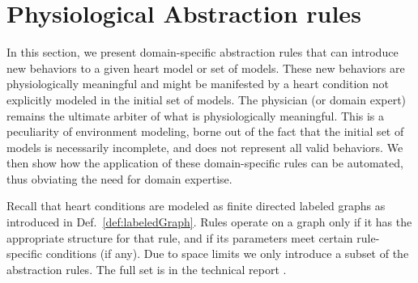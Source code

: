 \section{Physiological Abstraction rules}
\label{abstractionRules} 
In this section, we present domain-specific abstraction rules that can introduce new behaviors to a given heart model or set of models. 
These new behaviors are physiologically meaningful and might be manifested by a heart condition not explicitly modeled in the initial set of models.
The physician (or domain expert) remains the ultimate arbiter of what is physiologically meaningful.
This is a peculiarity of environment modeling, borne out of the fact that the initial set of models is necessarily incomplete, and does not represent all valid behaviors.
We then show how the application of these domain-specific rules can be automated, thus obviating the need for domain expertise.

Recall that heart conditions are modeled as finite directed labeled graphs as introduced in Def.~\ref{def:labeledGraph}.
Rules operate on a graph only if it has the appropriate structure for that rule, and if its parameters meet certain rule-specific conditions (if any).
Due to space limits we only introduce a subset of the abstraction rules. 
The full set is in the technical report \cite{regar_tech}.



